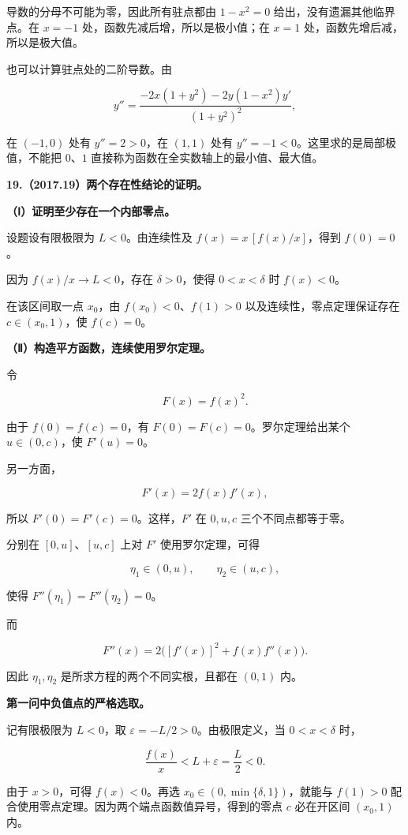 \documentclass[UTF8,11pt,fontset=windows]{ctexart}
\begin{document}
导数的分母不可能为零，因此所有驻点都由 $1-x^2=0$ 给出，没有遗漏其他临界点。在 $x=-1$ 处，函数先减后增，所以是极小值；在 $x=1$ 处，函数先增后减，所以是极大值。

也可以计算驻点处的二阶导数。由

$$
y''=\frac{-2x(1+y^2)-2y(1-x^2)y'}{(1+y^2)^2},
$$

在 $(-1,0)$ 处有 $y''=2>0$，在 $(1,1)$ 处有 $y''=-1<0$。这里求的是局部极值，不能把 $0$、$1$ 直接称为函数在全实数轴上的最小值、最大值。

\clearpage

\textbf{19.（2017.19）两个存在性结论的证明。}

\textbf{（Ⅰ）证明至少存在一个内部零点。}

设题设有限极限为 $L<0$。由连续性及 $f(x)=x\,[f(x)/x]$，得到 $f(0)=0$。

因为 $f(x)/x\to L<0$，存在 $\delta>0$，使得 $0<x<\delta$ 时 $f(x)<0$。

在该区间取一点 $x_0$，由 $f(x_0)<0$、$f(1)>0$ 以及连续性，零点定理保证存在 $c\in(x_0,1)$，使 $f(c)=0$。

\textbf{（Ⅱ）构造平方函数，连续使用罗尔定理。}

令

$$
F(x)=f(x)^2.
$$

由于 $f(0)=f(c)=0$，有 $F(0)=F(c)=0$。罗尔定理给出某个 $u\in(0,c)$，使 $F'(u)=0$。

另一方面，

$$
F'(x)=2f(x)f'(x),
$$

所以 $F'(0)=F'(c)=0$。这样，$F'$ 在 $0,u,c$ 三个不同点都等于零。

分别在 $[0,u]$、$[u,c]$ 上对 $F'$ 使用罗尔定理，可得

$$
\eta_1\in(0,u),\qquad \eta_2\in(u,c),
$$

使得 $F''(\eta_1)=F''(\eta_2)=0$。

而

$$
F''(x)=2\bigl([f'(x)]^2+f(x)f''(x)\bigr).
$$

因此 $\eta_1,\eta_2$ 是所求方程的两个不同实根，且都在 $(0,1)$ 内。

\textbf{第一问中负值点的严格选取。}

记有限极限为 $L<0$，取 $\varepsilon=-L/2>0$。由极限定义，当 $0<x<\delta$ 时，

$$
\frac{f(x)}x<L+\varepsilon=\frac L2<0.
$$

由于 $x>0$，可得 $f(x)<0$。再选 $x_0\in(0,\min\{\delta,1\})$，就能与 $f(1)>0$ 配合使用零点定理。因为两个端点函数值异号，得到的零点 $c$ 必在开区间 $(x_0,1)$ 内。
\end{document}
